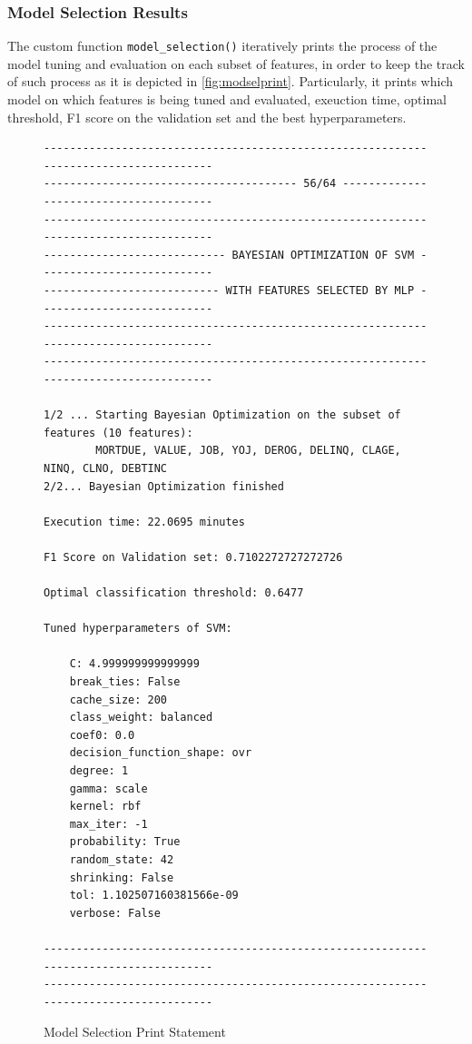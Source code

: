 \subsubsection{Model Selection Results}



The custom function \lstinline{model_selection()} iteratively prints the process of the model tuning and evaluation on each subset of features, in order to keep the track of such process as it is depicted in \autoref{fig:modselprint}.
Particularly, it prints which model on which features is being tuned and evaluated, exeuction time, optimal threshold, F1 score on the validation set and the best hyperparameters.

\begin{figure}[H]
\centering\caption{Model Selection Print Statement}
\label{fig:modselprint}

{\fontsize{8.8}{11}\selectfont 
\begin{verbatim}
-------------------------------------------------------------------------------------
--------------------------------------- 56/64 ---------------------------------------
-------------------------------------------------------------------------------------
---------------------------- BAYESIAN OPTIMIZATION OF SVM ---------------------------
--------------------------- WITH FEATURES SELECTED BY MLP ---------------------------
-------------------------------------------------------------------------------------
------------------------------------------------------------------------------------- 

1/2 ... Starting Bayesian Optimization on the subset of features (10 features):
        MORTDUE, VALUE, JOB, YOJ, DEROG, DELINQ, CLAGE, NINQ, CLNO, DEBTINC
2/2... Bayesian Optimization finished 

Execution time: 22.0695 minutes 

F1 Score on Validation set: 0.7102272727272726 

Optimal classification threshold: 0.6477 

Tuned hyperparameters of SVM: 

    C: 4.999999999999999
    break_ties: False
    cache_size: 200
    class_weight: balanced
    coef0: 0.0
    decision_function_shape: ovr
    degree: 1
    gamma: scale
    kernel: rbf
    max_iter: -1
    probability: True
    random_state: 42
    shrinking: False
    tol: 1.102507160381566e-09
    verbose: False

-------------------------------------------------------------------------------------
------------------------------------------------------------------------------------- 
\end{verbatim}
}
\vspace{0em}
\end{figure}



